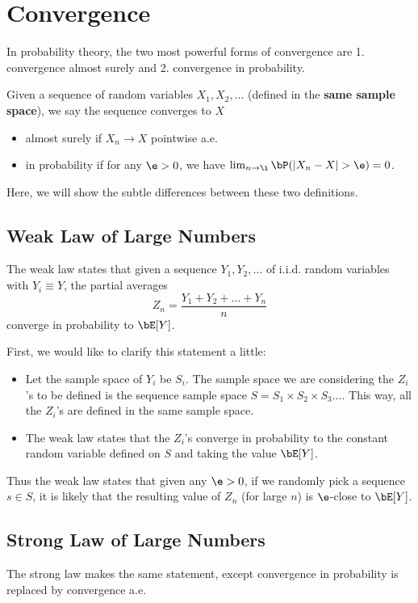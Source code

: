 \section*{Convergence}

In probability theory, the two most powerful forms of convergence are 1. convergence almost surely and 2. convergence in probability.

Given a sequence of random variables $X_1, X_2, \dots$ (defined in the \textbf{same sample space}), we say the sequence converges to $X$
\begin{itemize}
    \item almost surely if $X_n \to X$ pointwise a.e.
    \item in probability if for any $\e > 0$, we have $\lim_{n \to \i} \bP(|X_n-X| > \e) = 0$.
\end{itemize}
Here, we will show the subtle differences between these two definitions.

\subsection*{Weak Law of Large Numbers}
The weak law states that given a sequence $Y_1, Y_2, \dots$ of i.i.d. random variables with $Y_i \equiv Y$, the partial averages
\[
    Z_n = \frac{Y_1 + Y_2 + \dots + Y_n}{n}
\]
converge in probability to $\bE[Y]$.

First, we would like to clarify this statement a little:
\begin{itemize}
    \item Let the sample space of $Y_i$ be $S_i$. The sample space we are considering the $Z_i$'s to be defined is the sequence sample space $S = S_1 \times S_2 \times S_3 \dots$. This way, all the $Z_i$'s are defined in the same sample space.
    \item The weak law states that the $Z_i$'s converge in probability to the constant random variable defined on $S$ and taking the value $\bE[Y]$.
\end{itemize}
Thus the weak law states that given any $\e > 0$, if we randomly pick a sequence $s \in S$, it is likely that the resulting value of $Z_n$ (for large $n$) is $\e$-close to $\bE[Y]$.

\subsection*{Strong Law of Large Numbers}
The strong law makes the same statement, except convergence in probability is replaced by convergence a.e.

